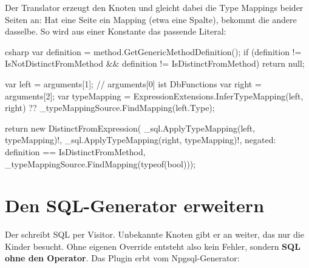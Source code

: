 Der Translator erzeugt den Knoten und gleicht dabei die Type Mappings beider Seiten an: Hat
eine Seite ein Mapping (etwa eine Spalte), bekommt die andere dasselbe. So wird aus einer
Konstante das passende Literal:

\begin{sourcecode}{csharp}
var definition = method.GetGenericMethodDefinition();
if (definition != IsNotDistinctFromMethod && definition != IsDistinctFromMethod)
    return null;

var left = arguments[1];                        // arguments[0] ist DbFunctions
var right = arguments[2];
var typeMapping = ExpressionExtensions.InferTypeMapping(left, right)
                  ?? _typeMappingSource.FindMapping(left.Type);

return new DistinctFromExpression(
    _sql.ApplyTypeMapping(left, typeMapping)!,
    _sql.ApplyTypeMapping(right, typeMapping)!,
    negated: definition == IsDistinctFromMethod,
    _typeMappingSource.FindMapping(typeof(bool)));
\end{sourcecode}

\section{Den SQL-Generator erweitern}

Der  schreibt SQL per Visitor. Unbekannte
Knoten gibt er an
 weiter, das
nur die Kinder besucht. Ohne eigenen Override entsteht also kein Fehler, sondern \textbf{SQL
ohne den Operator}. Das Plugin erbt vom Npgsql-Generator:

